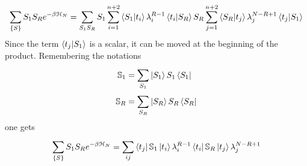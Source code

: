 \documentclass[../main/main.tex]{subfiles}
\begin{document}
\begin{equation*}
  \sum_{\{ S \}  }^{}  S_1 S_R e^{-\beta \mathcal{H}_N} = \sum_{S_1 S_R}^{} S_1 \sum_{i=1}^{n+2} \braket{S_1}{t_i} \lambda _i^{R-1} \braket{t_i}{S_R} S_R \sum_{j=1}^{n+2} \braket{S_R}{t_j} \lambda_j ^{N-R+1} \braket{t_j}{S_1}
\end{equation*}
Since the term \( \braket{t_j}{S_1}  \) is a scalar, it can be moved at the beginning of the product. Remembering the notations
\begin{subequations}
\begin{align}
  \mathbb{S}_1 &= \sum_{S_1}^{} \ket{S_1} S_1 \bra{S_1} \\
  \mathbb{S}_R &= \sum_{S_R}^{} \ket{S_R} S_R \bra{S_R}
\end{align}
\end{subequations}
one gets
\begin{equation}
  \sum_{\{ S \}  }^{}  S_1 S_R e^{-\beta \mathcal{H}_N}= \sum_{ij}^{} \bra{t_j } \mathbb{S}_1 \ket{t_i} \lambda _i^{R-1} \bra{t_i} \mathbb{S}_R \ket{t_j} \lambda _j ^{N-R+1}
\end{equation}
\end{document}
